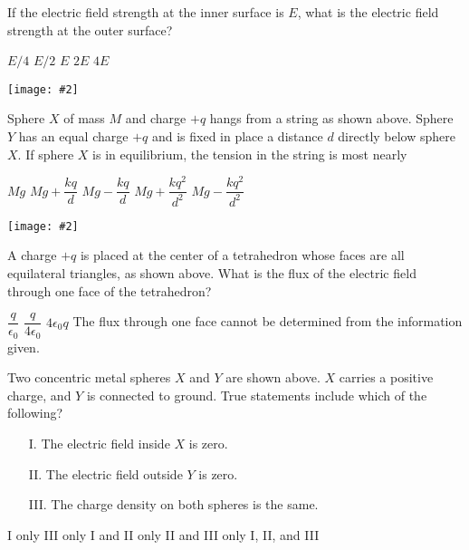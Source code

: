 \documentclass[12pt]{exam}
\newcommand{\pic}[2]{\texttt{[image: \#2]}}
\begin{document}
\begin{questions}
  \question If the electric field strength at the inner surface is $E$, what is
  the electric field strength at the outer surface?
  \begin{choices}
    \choice $E/4$
    \choice $E/2$
    \choice $E$
    \choice $2E$
    \choice $4E$
  \end{choices}
  \label{sphere2}
  \newpage
  
  \begin{center}
    \pic{.3}{2spheres}
  \end{center}
  \question Sphere $X$ of mass $M$ and charge $+q$ hangs from a string as shown
  above. Sphere $Y$ has an equal charge $+q$ and is fixed in place a distance
  $d$ directly below sphere $X$. If sphere $X$ is in equilibrium, the tension
  in the string is most nearly
  \begin{choices}
    \choice $Mg$
    \choice $Mg+\dfrac{kq}d$
    \choice $Mg-\dfrac{kq}d$
    \choice $Mg+\dfrac{kq^2}{d^2}$
    \choice $Mg-\dfrac{kq^2}{d^2}$
  \end{choices}

  \begin{center}
    \pic{.22}{tetrahedral}
  \end{center}
  \question A charge $+q$ is placed at the center of a tetrahedron whose faces
  are all equilateral triangles, as shown above. What is the flux of the
  electric field through one face of the tetrahedron?
  \begin{choices}
    \choice $\dfrac{q}{\epsilon_0}$
    \choice $\dfrac{q}{4\epsilon_0}$
    \choice $4\epsilon_0q$
    \choice The flux through one face cannot be determined from the information
    given.
  \end{choices}

  \begin{center}
  \end{center}
  \question Two concentric metal spheres $X$ and $Y$ are shown above. $X$
  carries a positive charge, and $Y$ is connected to ground. True statements
  include which of the following?
  \begin{enumerate}[topsep=0pt,itemsep=2pt]
  \item[I.] The electric field inside $X$ is zero.
  \item[II.] The electric field outside $Y$ is zero.
  \item[III.] The charge density on both spheres is the same.
  \end{enumerate}
  \begin{choices}
    \choice I only
    \choice III only
    \choice I and II only
    \choice II and III only
    \choice I, II, and III
  \end{choices}
  \newpage


\end{questions}
\end{document}
